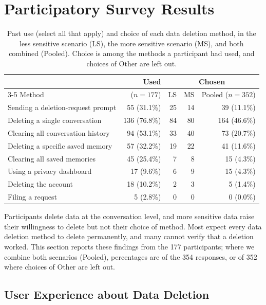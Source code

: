 \section{Participatory Survey Results}
\label{sec:qual_results}

\begin{table}[!t]
\centering
\caption{Past use (select all that apply) and choice of each data deletion method, in the less sensitive scenario (LS), the more sensitive scenario (MS), and both combined (Pooled). Choice is among the methods a participant had used, and choices of Other are left out.}
\label{tab:method-use}
\small
\begin{tabular}{@{}lrrrr@{}}
\toprule
 & Used & \multicolumn{3}{c}{Chosen} \\
\cmidrule(lr){3-5}
Method & ($n=177$) & LS & MS & Pooled ($n=352$) \\
\midrule
Sending a deletion-request prompt & 55 (31.1\%) & 25 & 14 & 39 (11.1\%) \\
Deleting a single conversation & 136 (76.8\%) & 84 & 80 & 164 (46.6\%) \\
Clearing all conversation history & 94 (53.1\%) & 33 & 40 & 73 (20.7\%) \\
Deleting a specific saved memory & 57 (32.2\%) & 19 & 22 & 41 (11.6\%) \\
Clearing all saved memories & 45 (25.4\%) & 7 & 8 & 15 (4.3\%) \\
Using a privacy dashboard & 17 (9.6\%) & 6 & 9 & 15 (4.3\%) \\
Deleting the account & 18 (10.2\%) & 2 & 3 & 5 (1.4\%) \\
Filing a request & 5 (2.8\%) & 0 & 0 & 0 (0.0\%) \\
\bottomrule
\end{tabular}
\end{table}

Participants delete data at the conversation level, and more sensitive data raise their willingness to delete but not their choice of method. Most expect every data deletion method to delete permanently, and many cannot verify that a deletion worked. This section reports these findings from the 177 participants; where we combine both scenarios (Pooled), percentages are of the 354 responses, or of 352 where choices of Other are left out.

\subsection{User Experience about Data Deletion}

